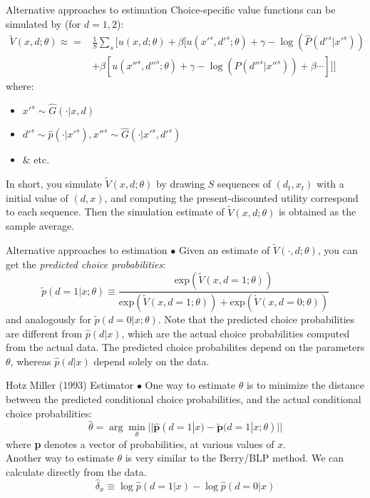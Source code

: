 \documentclass[xcolor=pdftex,dvipsnames,table,mathserif]{beamer}
\begin{document}
\begin{frame}{Alternative approaches to estimation}
Choice-specific value functions can be simulated by (for $d=1,2$): 
\begin{eqnarray*}
\tilde V (x, d; \theta) \approx = & \frac 1 S \sum_s [ u(x, d;\theta) + \beta [ u(x'^s, d'^s;\theta) + \gamma - \log(\hat P(d'^s|x'^s)) \\
& +\beta [ u(x''^s, d''^s;\theta) + \gamma - \log (\hat P (d''^s |x''^s)) + \beta \cdots ]]]
\end{eqnarray*}
where:
\begin{itemize}
\item $x'^s \sim \hat G(\cdot | x, d)$ 
\item $d'^s \sim \hat p(\cdot | x'^s), x''^s \sim \hat G(\cdot | x'^s, d'^s)$ 
\item \& etc. 
\end{itemize}
In short, you simulate $\tilde V (x, d;\theta)$ by drawing $S$ \alert{sequences} of $(d_t, x_t)$ with a initial value of $(d, x)$, and computing the present-discounted utility correspond to each sequence. Then the simulation estimate of $\tilde V (x, d;\theta)$ is obtained as the sample average. 
\end{frame}


\begin{frame}{Alternative approaches to estimation}
$\bullet$ Given an estimate of $\tilde V (\cdot, d; \theta)$, you can get the \emph{predicted choice probabilities}: 
\begin{equation}
\tilde p (d =1 |x ; \theta) \equiv \frac {\text{exp} \left ( \tilde V (x, d=1; \theta) \right )}{\text{exp} \left ( \tilde V (x, d=1 ;\theta) \right ) + \text{exp} \left ( \tilde V (x, d= 0 ;\theta ) \right )}
\end{equation}
and analogously for $\tilde p (d = 0 |x ; \theta)$. Note that the predicted choice probabilities are different from $\hat p (d|x)$, which are the actual choice probabilities computed from the actual data. The predicted choice probabilites depend on the parameters $\theta$, whereas $\hat p (d|x)$ depend solely on the data. 
\end{frame}

\begin{frame}{Hotz Miller (1993) Estimator}
$\bullet$ One way to estimate $\theta$ is to minimize the distance between the predicted conditional choice probabilities, and the actual conditional choice probabilities:
\begin{equation*}
\hat \theta = \arg \min_\theta || \hat {\mathbf{p}} (d = 1 |x) - \tilde {\mathbf{p}} (d = 1 |x; \theta) ||
\end{equation*}
where \textbf{p} denotes a vector of probabilities, at various values of $x$. \\
Another way to estimate $\theta$ is very similar to the Berry/BLP method. We can calculate directly from the data. 
\begin{equation*}
\hat \delta_x \equiv \log \hat p ( d =1 |x) - \log \hat p (d = 0 |x)
\end{equation*}
\end{frame}
\end{document}
